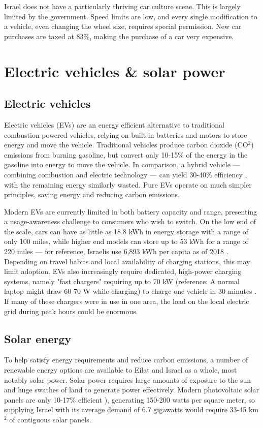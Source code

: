 \documentclass{report}                         %
\begin{document}
Israel does not have a particularly thriving car culture scene. This is largely limited by the government. Speed limits are low, and every single modification to a vehicle, even changing the wheel size, requires special permission. New car purchases are taxed at 83\%, making the purchase of a car very expensive.

\section{Electric vehicles \& solar power}
\subsection{Electric vehicles}
Electric vehicles (EVs) are an energy efficient alternative to traditional combustion-powered vehicles, relying on built-in batteries and motors to store energy and move the vehicle. Traditional vehicles produce carbon dioxide (CO$^2$) emissions from burning gasoline, but convert only 10-15\% of the energy in the gasoline into energy to move the vehicle. In comparison, a hybrid vehicle --- combining combustion and electric technology --- can yield 30-40\% efficiency \cite{Zhu2015DistributedGrid}, with the remaining energy similarly wasted. Pure EVs operate on much simpler principles, saving energy and reducing carbon emissions.

Modern EVs are currently limited in both battery capacity and range, presenting a usage-awareness challenge to consumers who wish to switch. On the low end of the scale, cars can have as little as 18.8 kWh in energy storage with a range of only 100 miles, while higher end models can store up to 53 kWh for a range of 220 miles \cite{Ustun2015ImpactSystems} --- for reference, Israelis use 6,893 kWh per capita as of 2018 \cite{2018Key2018}. Depending on travel habits and local availability of charging stations, this may limit adoption. EVs also increasingly require dedicated, high-power charging systems, namely "fast chargers" requiring up to 70 kW (reference: A normal laptop might draw 60-70 W while charging) to charge one vehicle in 30 minutes \cite{Ustun2015ImpactSystems}. If many of these chargers were in use in one area, the load on the local electric grid during peak hours could be enormous.

\subsection{Solar energy}
To help satisfy energy requirements and reduce carbon emissions, a number of renewable energy options are available to Eilat and Israel as a whole, most notably solar power. Solar power requires large amounts of exposure to the sun and huge swathes of land to generate power effectively. Modern photovoltaic solar panels are only 10-17\% efficient \cite{Zhu2015DistributedGrid}), generating 150-200 watts per square meter, so supplying Israel with its average demand of 6.7 gigawatts would require 33-45 km$^2$ of contiguous solar panels.
\end{document}
